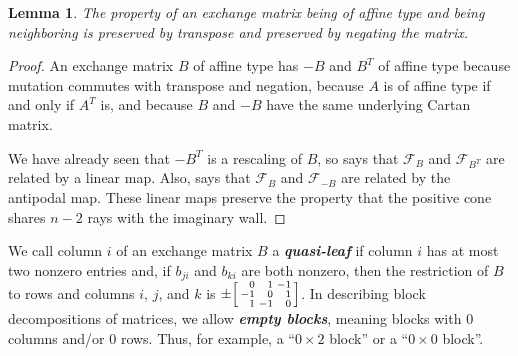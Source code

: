 \documentclass{amsart}
\newtheorem{lemma}[proposition]{Lemma}
\theoremstyle{definition}
\theoremstyle{remark}
\numberwithin{equation}{section}
\newcommand{\newword}[1]{\textbf{\emph{#1}}}
\newcommand{\F}{{\mathcal F}}
\newcommand{\0}{{\mathbf{0}}}
\begin{document}
\begin{lemma}\label{neigh neg and T}
The property of an exchange matrix being of affine type and being neighboring is preserved by transpose and preserved by negating the matrix.
\end{lemma}
\begin{proof}
An exchange matrix $B$ of affine type has $-B$ and $B^T$ of affine type because mutation commutes with transpose and negation, because $A$ is of affine type if and only if $A^T$ is, and because $B$ and $-B$ have the same underlying Cartan matrix.

We have already seen that $-B^T$ is a rescaling of $B$, so \cite[Proposition~7.8(3)]{universal} says that $\F_B$ and $\F_{B^T}$ are related by a linear map.
Also, \cite[Proposition~7.1]{universal} says that $\F_B$ and $\F_{-B}$ are related by the antipodal map.
These linear maps preserve the property that the positive cone shares $n-2$ rays with the imaginary wall.
\end{proof}

We call column $i$ of an exchange matrix $B$ a \newword{quasi-leaf} if column $i$ has at most two nonzero entries and, if $b_{ji}$ and $b_{ki}$ are both nonzero, then the restriction of $B$ to rows and columns $i$, $j$, and $k$ is $\pm\begin{bsmallmatrix*}[r]0&1&-1\\-1&0&1\\1&-1&0\end{bsmallmatrix*}$.
In describing block decompositions of matrices, we allow \newword{empty blocks}, meaning blocks with $0$ columns and/or $0$ rows.
Thus, for example, a ``$0\times 2$ block'' or a ``$0\times 0$ block''.
\end{document}
